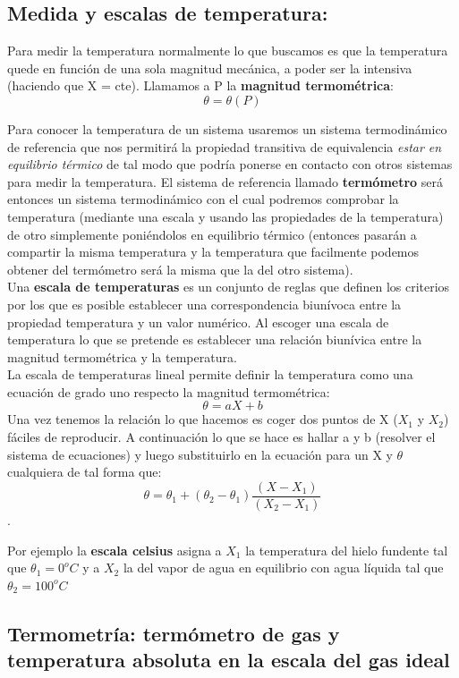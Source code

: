 \documentclass[12pt,a4paper]{article}
\begin{document}
\subsection{Medida y escalas de temperatura:}

Para medir la temperatura normalmente lo que buscamos es que la temperatura quede en función de una sola magnitud mecánica, a poder ser la intensiva (haciendo que X = cte). Llamamos a P la \textbf{magnitud termométrica}:
$$ \theta = \theta (P) $$


Para conocer la temperatura de un sistema usaremos un sistema termodinámico de referencia que nos permitirá la propiedad transitiva de equivalencia \textit{estar en equilibrio térmico} de tal modo que podría ponerse en contacto con otros sistemas para medir la temperatura. El sistema de referencia llamado \textbf{termómetro} será entonces un sistema termodinámico con el cual podremos comprobar la temperatura (mediante una escala y usando las propiedades de la temperatura) de otro simplemente poniéndolos en equilibrio térmico (entonces pasarán a compartir la misma temperatura y la temperatura que facilmente podemos obtener del termómetro será la misma que la del otro sistema). \\

Una  \textbf{escala de temperaturas} es un conjunto de reglas que definen los criterios por los que es posible establecer una correspondencia biunívoca entre la propiedad temperatura y un valor numérico. Al escoger una escala de temperatura lo que se pretende es establecer una relación biunívica entre la magnitud termométrica y la temperatura. \\

La escala de temperaturas lineal permite definir la temperatura como una ecuación de grado uno respecto la magnitud termométrica:
$$ \theta = aX + b $$
Una vez tenemos la relación lo que hacemos es coger dos puntos de X ($X_1$ y $X_2$) fáciles de reproducir. A continuación lo que se hace es hallar a y b (resolver el sistema de ecuaciones) y luego substituirlo en la ecuación para un X y $\theta$ cualquiera de tal forma que:
$$ \theta = \theta_1 + (\theta_2- \theta_1)\dfrac{(X-X_1)}{(X_2-X_1)} $$. 

Por ejemplo la \textbf{escala celsius} asigna a $X_1$ la temperatura del hielo fundente tal que $\theta_1=0 ^oC$ y a $X_2$ la del vapor de agua en equilibrio con agua líquida tal que $\theta_2=100 ^oC$


\subsection{Termometría: termómetro de gas y temperatura absoluta en la escala del gas ideal}
\end{document}
